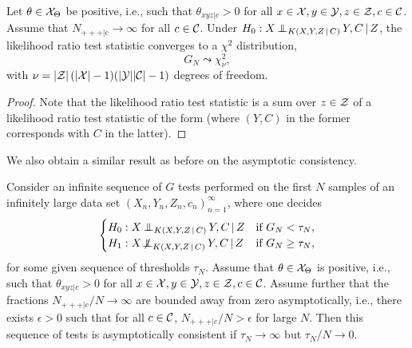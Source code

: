 \begin{Prp}\label{prp:general_G_test_asymptotics_H0}
  Let $\theta \in \mathcal{X}_\Theta$ be positive, i.e., such that $\theta_{xyz|c} > 0$ for all $x \in \mathcal{X}, y \in \mathcal{Y}, z \in \mathcal{Z}, c \in \mathcal{C}$.
  Assume that $N_{+++|c} \to \infty$ for all $c \in \mathcal{C}$.
  Under $H_0 : X \operatorname*{\perp\mkern-11mu\perp}_{K(X,Y,Z \operatorname*{|} C)} Y,C \operatorname*{|} Z$, the likelihood ratio test statistic  converges
  to a $\chi^2$ distribution,
  $$G_N \leadsto \chi^2_\nu,$$
  with $\nu = |\mathcal{Z}|\,(|\mathcal{X}| - 1)(|\mathcal{Y}||\mathcal{C}| - 1)$ degrees of freedom.
\end{Prp}
\begin{proof}
  Note that the likelihood ratio test statistic  is a sum
  over $z \in \mathcal{Z}$ of a likelihood ratio test statistic of the form 
   (where $(Y,C)$ in the former corresponds with $C$ in the latter). 
\end{proof}
We also obtain a similar result as before on the asymptotic consistency.
\begin{Cor}\label{cor:gen_G_test_consistency}
Consider an infinite sequence of $G$ tests performed on the first $N$ samples of an infinitely large
data set $(X_n,Y_n,Z_n,c_n)_{n=1}^\infty$,
where one decides
  $$\begin{cases}
    H_0 : X \operatorname*{\perp\mkern-11mu\perp}_{K(X,Y,Z \operatorname*{|} C)} Y,C \operatorname*{|} Z     & \text{if $G_N < \tau_N$},\\
    H_1 : X \operatorname*{\not\mkern-2mu\perp\mkern-11mu\perp}_{K(X,Y,Z \operatorname*{|} C)} Y,C \operatorname*{|} Z & \text{if $G_N \ge \tau_N$,}
  \end{cases}$$
for some given sequence of thresholds $\tau_N$.
Assume that $\theta \in \mathcal{X}_\Theta$ is positive, i.e., such that $\theta_{xyz|c} > 0$ for all $x \in \mathcal{X}, y \in \mathcal{Y}, z \in \mathcal{Z}, c \in \mathcal{C}$.
Assume further that the fractions $N_{+++|c} / N \to \infty$ are bounded away from zero asymptotically,
i.e., there exists $\epsilon > 0$ such that for all $c \in \mathcal{C}$, $N_{+++|c} / N > \epsilon$ for large $N$.
Then this sequence of tests is asymptotically consistent if $\tau_N \to \infty$ but $\tau_N / N \to 0$.
\end{Cor}

